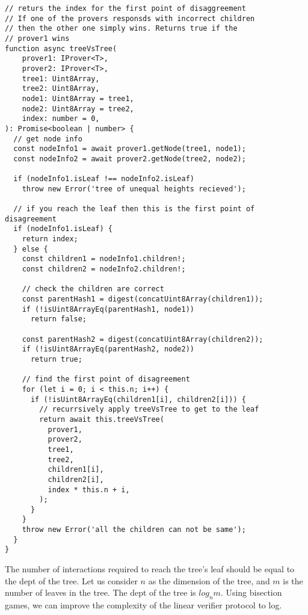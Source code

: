 \documentclass[a4paper,11pt,oneside]{article}
\theoremstyle{definition}
\begin{document}
  \begin{lstlisting}
// returs the index for the first point of disaggreement
// If one of the provers responsds with incorrect children
// then the other one simply wins. Returns true if the 
// prover1 wins 
function async treeVsTree(
    prover1: IProver<T>,
    prover2: IProver<T>,
    tree1: Uint8Array,
    tree2: Uint8Array,
    node1: Uint8Array = tree1,
    node2: Uint8Array = tree2,
    index: number = 0,
): Promise<boolean | number> {
  // get node info
  const nodeInfo1 = await prover1.getNode(tree1, node1);
  const nodeInfo2 = await prover2.getNode(tree2, node2);

  if (nodeInfo1.isLeaf !== nodeInfo2.isLeaf)
    throw new Error('tree of unequal heights recieved');

  // if you reach the leaf then this is the first point of disagreement
  if (nodeInfo1.isLeaf) {
    return index;
  } else {
    const children1 = nodeInfo1.children!;
    const children2 = nodeInfo2.children!;
 
    // check the children are correct
    const parentHash1 = digest(concatUint8Array(children1));
    if (!isUint8ArrayEq(parentHash1, node1))
      return false;

    const parentHash2 = digest(concatUint8Array(children2));
    if (!isUint8ArrayEq(parentHash2, node2))
      return true;

    // find the first point of disagreement
    for (let i = 0; i < this.n; i++) {
      if (!isUint8ArrayEq(children1[i], children2[i])) {
        // recurrsively apply treeVsTree to get to the leaf
        return await this.treeVsTree(
          prover1,
          prover2,
          tree1,
          tree2,
          children1[i],
          children2[i],
          index * this.n + i,
        );
      }
    }
    throw new Error('all the children can not be same');
  }
}
  \end{lstlisting}
  
  The number of interactions required to reach the tree's leaf should be equal to the dept of the tree. Let us consider $n$ as the dimension of the tree, and $m$ is the number of leaves in the tree. The dept of the tree is $log_nm$. Using bisection games, we can improve the complexity of the linear verifier protocol to log.
  
\end{document}
